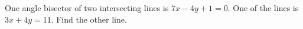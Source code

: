 One angle bisector of two intersecting lines is $7x-4y+1=0$. One of the lines is $3x+4y=11$. Find the other line.
